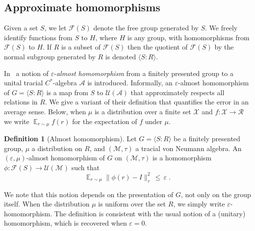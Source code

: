 \documentclass[11pt]{article}
\theoremstyle{definition}
\newtheorem{definition}[theorem]{Definition}
\newcommand{\Id}{\ensuremath{I}}
\DeclareMathOperator*{\Expectation}{\mathbb{E}}
\newcommand{\Es}[1]{\Expectation_{#1}}
\newcommand{\Z}{\ensuremath{\mathbb{Z}}}
\newcommand{\mA}{\ensuremath{\mathcal{A}}}
\newcommand{\mF}{\ensuremath{\mathcal{F}}}
\newcommand{\mM}{\ensuremath{\mathcal{M}}}
\newcommand{\mR}{\ensuremath{\mathcal{R}}}
\newcommand{\mU}{\ensuremath{\mathcal{U}}}
\newcommand{\mX}{\ensuremath{\mathcal{X}}}
\newcommand{\eps}{\varepsilon}
\begin{document}
\subsection{Approximate homomorphisms}

Given a set $S$, we let $\mF(S)$ denote the free group generated by $S$. We freely identify functions from $S$ to $H$, where $H$ is any group, with homomorphisms from $\mF(S)$ to $H$. If $R$ is a subset of $\mF(S)$ then the quotient of $\mF(S)$ by the normal subgroup generated by $R$ is denoted $\langle S:R\rangle$. 


In~\cite[Section 2]{hadwin2018stability} a notion of $\eps$-\emph{almost homomorphism} from a finitely presented group to a unital tracial $C^*$-algebra $\mA$ is introduced. Informally, an $\eps$-almost homomorphism of $G=\langle S:R\rangle$ is a map from $S$ to $\mU(\mA)$ that approximately respects all relations in $R$. We give a variant of their definition that quantifies the error in an average sense. Below, when $\mu$ is a distribution over a finite set $\mX$ and $f:\mX\to \mR$ we write $\Es{r\sim \mu} f(r)$ for the expectation of $f$ under $\mu$. 

\begin{definition}[Almost homomorphism]
Let $G = \langle S:R\rangle $ be a finitely presented group, $\mu$ a distribution on $R$, and $(\mM,\tau)$ a tracial von Neumann algebra. An $(\eps,\mu)$-almost homomorphism of $G$ on $(\mM,\tau)$ is a homomorphism $\phi:\mF(S)\to\mU(\mM)$ such that
\[ \Es{r\sim \mu} \big\|  \phi(r) - \Id \big \|_\tau^2 \,\leq\, \eps\;.\]
\end{definition}

We note that this notion depends on the presentation of $G$, not only on the group itself. 
When the distribution $\mu$ is uniform over the set $R$, we simply write $\eps$-homomorphism. The definition is consistent with the usual notion of a (unitary) homomorphism, which is recovered when $\eps=0$. 
\end{document}
